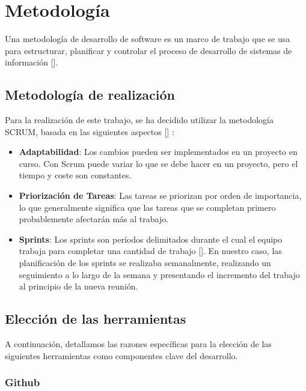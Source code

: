 
\chapter{Metodología}
\label{metodologia}
Una metodología de desarrollo de software es un marco de trabajo que se usa para estructurar, planificar y controlar el proceso de desarrollo de sistemas de información [\citep{def_metodologia}].

\section{Metodología de realización}
Para la  realización de este trabajo, se ha decidido utilizar la metodología SCRUM, basada en las siguientes aspectos [\cite{why_scrum}] :

\begin{itemize}
	\item \textbf{Adaptabilidad}: Los cambios pueden ser implementados en un proyecto en curso. Con Scrum puede variar lo que se debe hacer en un proyecto, pero el tiempo y coste son constantes.
	\item \textbf{Priorización de Tareas}: Las tareas se priorizan por orden de importancia, lo que generalmente significa que las tareas que se completan primero probablemente afectarán más al trabajo.
	\item \textbf{Sprints}: Los sprints son períodos delimitados durante el cual el equipo trabaja para completar una cantidad de trabajo [\cite{def_sprints}]. En nuestro caso, las planificación de los sprints se realizaba semanalmente, realizando un seguimiento a lo largo de la semana y presentando el incremento del trabajo al principio de la nueva reunión.
\end{itemize}

\section{Elección de las herramientas}
A continuación, detallamos las razones específicas para la elección de las siguientes herramientas como componentes clave del desarrollo.

\subsection{Github}

